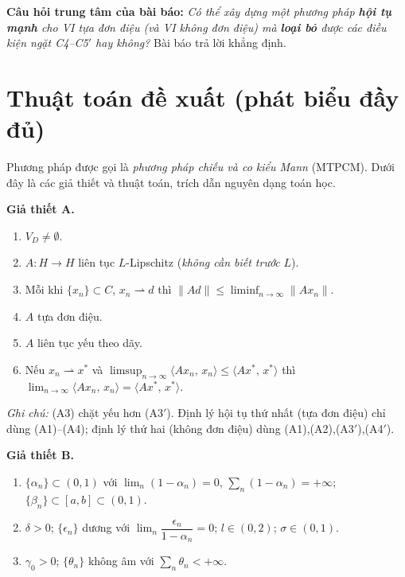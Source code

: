 \documentclass[11pt,a4paper]{article}
\theoremstyle{plain}
\theoremstyle{definition}
\newcommand{\inp}[2]{\langle #1,\,#2\rangle}
\newcommand{\nm}[1]{\lVert #1\rVert}
\newcommand{\wto}{\rightharpoonup}
\begin{document}
\medskip
\noindent\textbf{Câu hỏi trung tâm của bài báo:} \emph{Có thể xây dựng một phương pháp \textbf{hội tụ mạnh} cho VI tựa đơn điệu (và VI không đơn điệu) mà \textbf{loại bỏ} được các điều kiện ngặt C4--C5$'$ hay không?} Bài báo trả lời khẳng định.

\section{Thuật toán đề xuất (phát biểu đầy đủ)}

Phương pháp được gọi là \emph{phương pháp chiếu và co kiểu Mann} (MTPCM). Dưới đây là các giả thiết và thuật toán, trích dẫn nguyên dạng toán học.

\medskip
\noindent\textbf{Giả thiết A.}
\begin{enumerate}[label=(A\arabic*),leftmargin=2.4em,itemsep=1pt]
\item $V_D\ne\emptyset$.
\item $A:H\to H$ liên tục $L$-Lipschitz (\emph{không cần biết trước} $L$).
\item Mỗi khi $\{x_n\}\subset C$, $x_n\wto d$ thì $\nm{Ad}\le\liminf_{n\to\infty}\nm{Ax_n}$.
\item $A$ tựa đơn điệu.
\item[(A3$'$)] $A$ liên tục yếu theo dãy.
\item[(A4$'$)] Nếu $x_n\wto x^{*}$ và $\limsup_{n\to\infty}\inp{Ax_n}{x_n}\le\inp{Ax^{*}}{x^{*}}$ thì $\lim_{n\to\infty}\inp{Ax_n}{x_n}=\inp{Ax^{*}}{x^{*}}$.
\end{enumerate}
\emph{Ghi chú:} (A3) chặt yếu hơn (A3$'$). Định lý hội tụ thứ nhất (tựa đơn điệu) chỉ dùng (A1)--(A4); định lý thứ hai (không đơn điệu) dùng (A1),(A2),(A3$'$),(A4$'$).

\medskip
\noindent\textbf{Giả thiết B.}
\begin{enumerate}[label=(B\arabic*),leftmargin=2.4em,itemsep=1pt]
\item $\{\alpha_n\}\subset(0,1)$ với $\lim_{n}(1-\alpha_n)=0$, $\sum_n(1-\alpha_n)=+\infty$; $\{\beta_n\}\subset[a,b]\subset(0,1)$.
\item $\delta>0$; $\{\epsilon_n\}$ dương với $\lim_n\dfrac{\epsilon_n}{1-\alpha_n}=0$; $l\in(0,2)$; $\sigma\in(0,1)$.
\item $\gamma_0>0$; $\{\theta_n\}$ không âm với $\sum_n\theta_n<+\infty$.
\end{enumerate}
\end{document}
